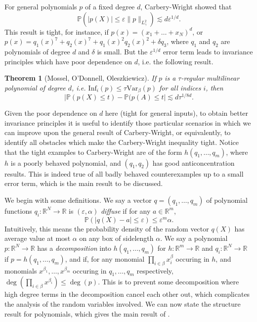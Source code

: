 \documentclass{article}
\theoremstyle{plain}
\newtheorem{theorem}{Theorem}
\theoremstyle{definition}
\begin{document}
For general polynomials $p$ of a fixed degree $d$, Carbery-Wright showed that
%
\[ \mathbb{P}(|p(X)| \leq \varepsilon \| p \|_{L^2_\gamma}) \lesssim d \varepsilon^{1/d}. \]
%
This result is tight, for instance, if $p(x) = (x_1 + \dots + x_N)^d$, or $p(x) = q_1(x)^7 + q_2(x)^7 + q_1(x)^2 q_2(x)^2 + \delta q_3$, where $q_1$ and $q_2$ are polynomials of degree $d$ and $\delta$ is small. But the $\varepsilon^{1/d}$ error term leads to invariance principles which have poor dependence on $d$, i.e. the following result.

\begin{theorem}[Mossel, O'Donnell, Oleszkiewicz]
    If $p$ is a \emph{$\tau$-regular} multilinear polynomial of degree $d$, i.e. $\text{Inf}_i(p) \leq \tau \text{Var}_\beta(p)$ for all indices $i$, then
    \[ |\mathbb{P}(p(X) \leq t) - \mathbb{P}(p(A) \leq t| \lesssim d \tau^{1/8d}. \]
\end{theorem}

Given the poor dependence on $d$ here (tight for general inputs), to obtain better invariance principles it is useful to identify those particular scenarios in which we can improve upon the general result of Carbery-Wright, or equivalently, to identify all obstacles which make the Carbery-Wright inequality tight. Notice that the tight examples to Carbery-Wright are of the form $h(q_1,\dots,q_m)$, where $h$ is a poorly behaved polynomial, and $(q_1,q_2)$ has good anticoncentration results. This is indeed true of all badly behaved counterexamples up to a small error term, which is the main result to be discussed.

We begin with some definitions. We say a vector $q = (q_1,\dots,q_m)$ of polynomial functions $q_i: \mathbb{R}^N \to \mathbb{R}$ is $(\varepsilon,\alpha)$ \emph{diffuse} if for any $a \in \mathbb{R}^m$,
%
\[ \mathbb{P}(|q(X) - a| \leq \varepsilon) \leq \varepsilon^m \alpha. \]
%
Intuitively, this means the probability density of the random vector $q(X)$ has average value at most $\alpha$ on any box of sidelength $\alpha$. We say a polynomial $p: \mathbb{R}^N \to \mathbb{R}$ has a \emph{decomposition} into $h(q_1,\dots,q_m)$ for $h: \mathbb{R}^m \to \mathbb{R}$ and $q_i: \mathbb{R}^N \to \mathbb{R}$ if $p = h(q_1,\dots,q_m)$, and if, for any monomial $\prod_{i \in \beta} x_i^\beta$ occuring in $h$, and monomials $x^{\beta_1}, \dots, x^{\beta_m}$ occuring in $q_1,\dots,q_m$ respectively, $\deg(\prod_{i \in \beta} x^{\beta_i}) \leq \deg(p)$. This is to prevent some decomposition where high degree terms in the decomposition cancel each other out, which complicates the analysis of the random variables involved. We can now state the structure result for polynomials, which gives the main result of \cite{Kane}.
\end{document}
